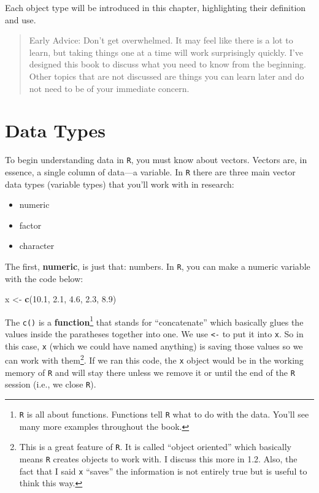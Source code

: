 \documentclass[]{tufte-book}
\newenvironment{Shaded}{}{}
\newcommand{\KeywordTok}[1]{\textcolor[rgb]{0.00,0.44,0.13}{\textbf{#1}}}
\newcommand{\FloatTok}[1]{\textcolor[rgb]{0.25,0.63,0.44}{#1}}
\newcommand{\StringTok}[1]{\textcolor[rgb]{0.25,0.44,0.63}{#1}}
\newcommand{\NormalTok}[1]{#1}
\providecommand{\tightlist}{%
  \setlength{\itemsep}{0pt}\setlength{\parskip}{0pt}}
\theoremstyle{definition}
\theoremstyle{definition}
\theoremstyle{remark}
\begin{document}
Each object type will be introduced in this chapter, highlighting their
definition and use.

\begin{quote}
Early Advice: Don't get overwhelmed. It may feel like there is a lot to
learn, but taking things one at a time will work surprisingly quickly.
I've designed this book to discuss what you need to know from the
beginning. Other topics that are not discussed are things you can learn
later and do not need to be of your immediate concern.
\end{quote}

\section*{Data Types}\label{data-types}

To begin understanding data in \texttt{R}, you must know about vectors.
Vectors are, in essence, a single column of data---a variable. In
\texttt{R} there are three main vector data types (variable types) that
you'll work with in research:

\begin{itemize}
\tightlist
\item
  numeric
\item
  factor
\item
  character
\end{itemize}

The first, \textbf{numeric}, is just that: numbers. In \texttt{R}, you
can make a numeric variable with the code below:

\begin{Shaded}
\begin{Highlighting}[]
\NormalTok{x <-}\StringTok{ }\KeywordTok{c}\NormalTok{(}\FloatTok{10.1}\NormalTok{, }\FloatTok{2.1}\NormalTok{, }\FloatTok{4.6}\NormalTok{, }\FloatTok{2.3}\NormalTok{, }\FloatTok{8.9}\NormalTok{)}
\end{Highlighting}
\end{Shaded}

The \texttt{c()} is a \textbf{function}\footnote{\texttt{R} is all about
  functions. Functions tell \texttt{R} what to do with the data. You'll
  see many more examples throughout the book.} that stands for
``concatenate'' which basically glues the values inside the paratheses
together into one. We use \texttt{\textless{}-} to put it into
\texttt{x}. So in this case, \texttt{x} (which we could have named
anything) is saving those values so we can work with them\footnote{This
  is a great feature of \texttt{R}. It is called ``object oriented''
  which basically means \texttt{R} creates objects to work with. I
  discuss this more in 1.2. Also, the fact that I said \texttt{x}
  ``saves'' the information is not entirely true but is useful to think
  this way.}. If we ran this code, the \texttt{x} object would be in the
working memory of \texttt{R} and will stay there unless we remove it or
until the end of the \texttt{R} session (i.e., we close \texttt{R}).
\end{document}
